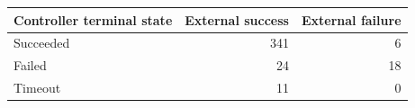 \begin{tabular}{lrr}
\toprule
Controller terminal state & External success & External failure \\
\midrule
Succeeded & 341 & 6 \\
Failed & 24 & 18 \\
Timeout & 11 & 0 \\
\bottomrule
\end{tabular}
